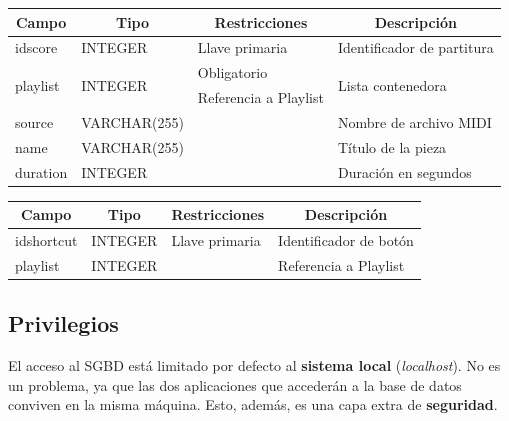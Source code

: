 \begin{center}
	\begin{tabular}{|l|l|l|l|}
		\hline \multicolumn{1}{|c|}{\textbf{Campo}} & \multicolumn{1}{c|}{\textbf{Tipo}} & \multicolumn{1}{c|}{\textbf{Restricciones}} & \multicolumn{1}{c|}{\textbf{Descripción}} \\
		\hline idscore & INTEGER & Llave primaria & Identificador de partitura \\ 
		\hline \multirow{2}{*}{playlist} & \multirow{2}{*}{INTEGER} & Obligatorio & \multirow{2}{*}{Lista contenedora} \\
		\cline{3-3} & & Referencia a Playlist & \\
		\hline source & VARCHAR(255) & & Nombre de archivo MIDI \\
		\hline name & VARCHAR(255) & & Título de la pieza \\
		\hline duration & INTEGER & & Duración en segundos \\
		\hline 
	\end{tabular}
	\smallskip
\end{center}

\smallskip

\smallskip

\begin{center}
	\begin{tabular}{|l|l|l|l|}
		\hline \multicolumn{1}{|c|}{\textbf{Campo}} & \multicolumn{1}{c|}{\textbf{Tipo}} & \multicolumn{1}{c|}{\textbf{Restricciones}} & \multicolumn{1}{c|}{\textbf{Descripción}} \\
		\hline idshortcut & INTEGER & Llave primaria & Identificador de botón \\ 
		\hline playlist & INTEGER & & Referencia a Playlist \\ 
		\hline 
	\end{tabular}
	\smallskip
\end{center}

\smallskip

\subsection{Privilegios}

El acceso al \acrshort{SGBD} está limitado por defecto al \textbf{sistema local} (\textit{localhost}). No es un problema, ya que las dos aplicaciones que accederán a la base de datos conviven en la misma máquina. Esto, además, es una capa extra de \textbf{seguridad}.

